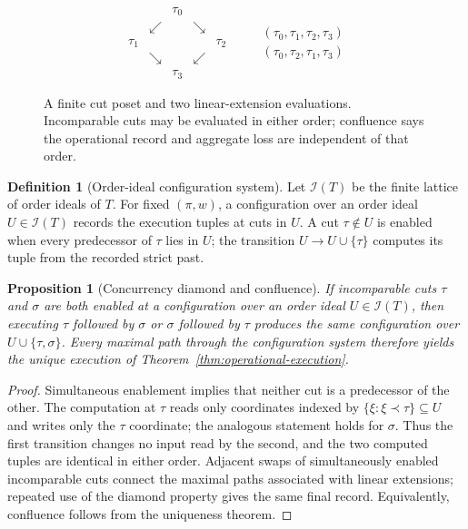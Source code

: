 \documentclass[11pt]{article}
\theoremstyle{plain}
\newtheorem{proposition}[theorem]{Proposition}
\theoremstyle{definition}
\newtheorem{definition}[theorem]{Definition}
\theoremstyle{remark}
\begin{document}
\begin{figure}[htbp]
\centering
\[
\begin{array}{ccccc}
&& \tau_0 &&\\[-1mm]
& \swarrow && \searrow &\\[-1mm]
\tau_1 &&&& \tau_2\\[-1mm]
& \searrow && \swarrow &\\[-1mm]
&& \tau_3 &&
\end{array}
\qquad
\begin{array}{l}
(\tau_0,\tau_1,\tau_2,\tau_3)\\
(\tau_0,\tau_2,\tau_1,\tau_3)
\end{array}
\]
\caption{A finite cut poset and two linear-extension evaluations. Incomparable
cuts may be evaluated in either order; confluence says the operational record and
aggregate loss are independent of that order.}
\label{fig:cut-poset-linearisation}
\end{figure}

\begin{definition}[Order-ideal configuration system]
\label{def:order-ideal-configuration}
Let $\mathcal I(T)$ be the finite lattice of order ideals of $T$. For fixed
$(\pi,w)$, a configuration over an order ideal $U\in\mathcal I(T)$ records the
execution tuples at cuts in $U$. A cut $\tau\notin U$ is enabled when every
predecessor of $\tau$ lies in $U$; the transition $U\to U\cup\{\tau\}$ computes
its tuple from the recorded strict past.
\end{definition}

\begin{proposition}[Concurrency diamond and confluence]
\label{prop:operational-confluence}
If incomparable cuts $\tau$ and $\sigma$ are both enabled at a configuration over
an order ideal $U\in\mathcal I(T)$, then executing $\tau$ followed by $\sigma$ or
$\sigma$ followed by $\tau$ produces the same configuration over
$U\cup\{\tau,\sigma\}$. Every maximal path
through the configuration system therefore yields the unique execution of
Theorem~\ref{thm:operational-execution}.
\end{proposition}

\begin{proof}
Simultaneous enablement implies that neither cut is a predecessor of the other.
The computation at $\tau$ reads only coordinates indexed by
$\{\xi:\xi\prec\tau\}\subseteq U$ and writes only the $\tau$ coordinate;
the analogous statement holds for $\sigma$. Thus the first transition changes
no input read by the second, and the two computed tuples are identical in either
order. Adjacent swaps of simultaneously enabled incomparable cuts connect the
maximal paths associated with linear extensions; repeated use of the diamond
property gives the same final record. Equivalently, confluence follows from the
uniqueness theorem.
\end{proof}
\end{document}
